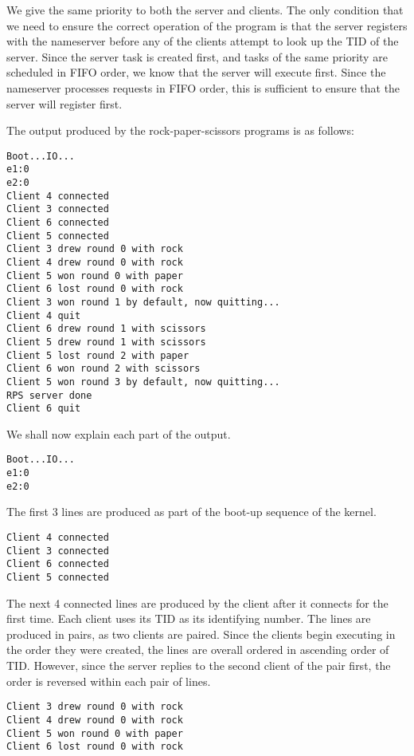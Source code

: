 \documentclass[titlepage]{article}
\begin{document}
We give the same priority to both the server and clients.
The only condition that we need to ensure the correct operation of the program
is that the server registers with the nameserver before
any of the clients attempt to look up the TID of the server.
Since the server task is created first, and tasks of the same priority are scheduled in FIFO order,
we know that the server will execute first.
Since the nameserver processes requests in FIFO order, this is sufficient to
ensure that the server will register first.

The output produced by the rock-paper-scissors programs is as follows:

\begin{verbatim}
Boot...IO...
e1:0
e2:0
Client 4 connected
Client 3 connected
Client 6 connected
Client 5 connected
Client 3 drew round 0 with rock
Client 4 drew round 0 with rock
Client 5 won round 0 with paper
Client 6 lost round 0 with rock
Client 3 won round 1 by default, now quitting...
Client 4 quit
Client 6 drew round 1 with scissors
Client 5 drew round 1 with scissors
Client 5 lost round 2 with paper
Client 6 won round 2 with scissors
Client 5 won round 3 by default, now quitting...
RPS server done
Client 6 quit
\end{verbatim}

We shall now explain each part of the output.

\begin{verbatim}
Boot...IO...
e1:0
e2:0
\end{verbatim}

The first 3 lines are produced as part of the boot-up sequence of the kernel.

\begin{verbatim}
Client 4 connected
Client 3 connected
Client 6 connected
Client 5 connected
\end{verbatim}

The next 4 connected lines are produced by the client after it connects for
the first time.
Each client uses its TID as its identifying number.
The lines are produced in pairs, as two clients are paired.
Since the clients begin executing in the order they were created, the lines are
overall ordered in ascending order of TID\@.
However, since the server replies to the second client of the pair first,
the order is reversed within each pair of lines.

\begin{verbatim}
Client 3 drew round 0 with rock
Client 4 drew round 0 with rock
Client 5 won round 0 with paper
Client 6 lost round 0 with rock
\end{verbatim}
\end{document}
